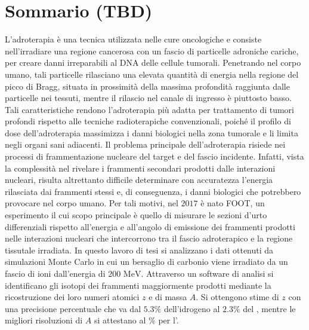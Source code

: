 \documentclass[12pt,a4paper,twoside]{report}
\begin{document}
	\chapter*{Sommario (TBD)}
	L'adroterapia è una tecnica utilizzata nelle cure oncologiche e consiste nell'irradiare una regione cancerosa con un fascio di particelle adroniche cariche, per creare danni irreparabili al DNA delle cellule tumorali. Penetrando nel corpo umano, tali particelle rilasciano una elevata quantità di energia nella regione del picco di Bragg, situata in prossimità della massima profondità raggiunta dalle particelle nei tessuti, mentre il rilascio nel canale di ingresso è piuttosto basso. Tali caratteristiche rendono l'adroterapia più adatta per trattamento di tumori profondi rispetto alle tecniche radioterapiche convenzionali, poiché il profilo di dose dell'adroterapia massimizza i danni biologici nella zona tumorale e li limita negli organi sani adiacenti. Il problema principale dell'adroterapia risiede nei processi di frammentazione nucleare del target e del fascio incidente. Infatti, vista la complessità nel rivelare i frammenti secondari prodotti dalle interazioni nucleari, risulta altrettanto difficile determinare con accuratezza l'energia rilasciata dai frammenti stessi e, di conseguenza, i danni biologici che potrebbero provocare nel corpo umano. Per tali motivi, nel $2017$ è nato FOOT, un esperimento il cui scopo principale è quello di misurare le sezioni d'urto differenziali rispetto all'energia e all'angolo di emissione dei frammenti prodotti nelle interazioni nucleari che intercorrono tra il fascio adroterapico e la regione tissutale irradiata. In questo lavoro di tesi si analizzano i dati ottenuti da simulazioni Monte Carlo in cui un bersaglio di carbonio  viene irradiato da un fascio di ioni  dall'energia di $200 \mbox{ MeV}$. Attraverso un software di analisi si identificano gli isotopi dei frammenti maggiormente prodotti mediante la ricostruzione dei loro numeri atomici $z$ e di massa $A$. Si ottengono stime di $z$ con una precisione percentuale che va dal $5.3\%$ dell'idrogeno  al $2.3\%$ del , mentre le migliori risoluzioni di $A$ si attestano al $\%$ per l'.
	\newpage
	\tableofcontents
	\newpage
\end{document}
